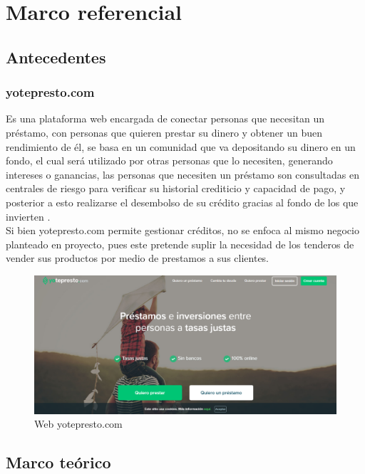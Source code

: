 \section{Marco referencial}

	\subsection{Antecedentes}
	
		\subsubsection{yotepresto.com}
		
		{Es una plataforma web encargada de conectar personas que necesitan un préstamo, con personas que quieren prestar su dinero y obtener un buen rendimiento de él, se basa en un comunidad que va depositando su dinero en un fondo, el cual será utilizado por otras personas que lo necesiten, generando intereses o ganancias, las personas que necesiten un préstamo son consultadas en centrales de riesgo para verificar su historial crediticio y capacidad de pago, y posterior a esto realizarse el desembolso de su crédito gracias al fondo de los que invierten \cite{yotepresto}.\\
			
		Si bien yotepresto.com permite gestionar créditos, no se enfoca al mismo negocio planteado en proyecto, pues este pretende suplir la necesidad de los tenderos de vender sus productos por medio de prestamos a sus clientes.\\
		
		\begin{figure}[H]
			\centering
			\includegraphics[width=0.8\linewidth]{description/framework/yotepresto.png}
			\caption{Web yotepresto.com}
		\end{figure}
		
		}
	
	
	\subsection{Marco teórico}
	
